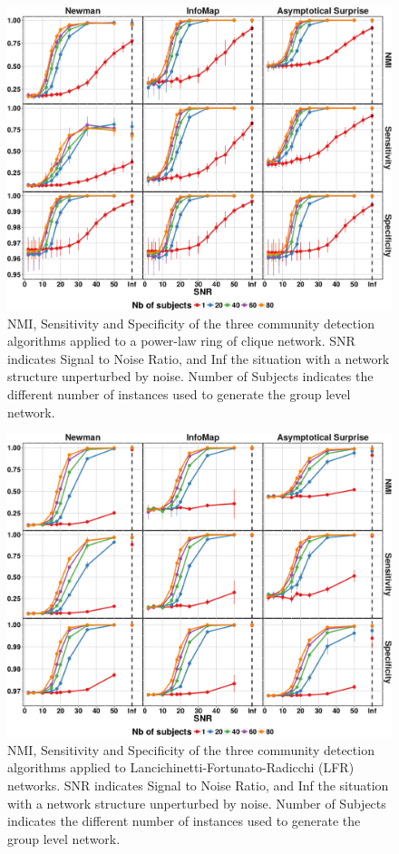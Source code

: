\begin{figure}[!ht]
\includegraphics[width=1.0\textwidth]{images/ring_clique_spec_sens.pdf}
\caption{NMI, Sensitivity and Specificity of the three community detection algorithms applied to a power-law ring of clique network. SNR indicates Signal to Noise Ratio, and Inf the situation with a network structure unperturbed by noise. Number of Subjects indicates the different number of instances used to generate the group level network.}
\label{fig:nmisensitivityspecificityringclique}
\end{figure}

\begin{figure}[!ht]
\includegraphics[width=1.0\textwidth]{images/lfr_spec_sens.pdf}
\caption{NMI, Sensitivity and Specificity of the three community detection algorithms applied to Lancichinetti-Fortunato-Radicchi (LFR) networks. SNR indicates Signal to Noise Ratio, and Inf the situation with a network structure unperturbed by noise. Number of Subjects indicates the different number of instances used to generate the group level network.}
\label{fig:nmisensitivityspecificitylfr}
\end{figure}

